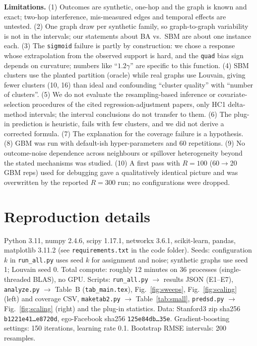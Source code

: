 \documentclass{article}
\begin{document}
\textbf{Limitations.} (1) Outcomes are synthetic, one-hop and the graph is known and exact; two-hop interference, mis-measured edges and temporal effects are untested. (2) One graph draw per synthetic family, so graph-to-graph variability is not in the intervals; our statements about BA vs.\ SBM are about one instance each. (3) The \texttt{sigmoid} failure is partly by construction: we chose a response whose extrapolation from the observed support is hard, and the \texttt{quad} bias sign depends on curvature; numbers like ``$1.2\gamma$'' are specific to this function. (4) SBM clusters use the planted partition (oracle) while real graphs use Louvain, giving fewer clusters (10, 16) than ideal and confounding ``cluster quality'' with ``number of clusters''. (5) We do not evaluate the resampling-based inference or covariate-selection procedures of the cited regression-adjustment papers, only HC1 delta-method intervals; the interval conclusions do not transfer to them. (6) The plug-in prediction is heuristic, fails with few clusters, and we did not derive a corrected formula. (7) The explanation for the coverage failure is a hypothesis. (8) GBM was run with default-ish hyper-parameters and 60 repetitions. (9) No outcome-noise dependence across neighbours or spillover heterogeneity beyond the stated mechanisms was studied. (10) A first pass with $R=100$ (60$\to$20 GBM reps) used for debugging gave a qualitatively identical picture and was overwritten by the reported $R=300$ run; no configurations were dropped.




\appendix
\section{Reproduction details}
Python 3.11, numpy 2.4.6, scipy 1.17.1, networkx 3.6.1, scikit-learn, pandas, matplotlib 3.11.2 (see \texttt{requirements.txt} in the code folder). Seeds: configuration $k$ in \texttt{run\_all.py} uses seed $k$ for assignment and noise; synthetic graphs use seed 1; Louvain seed 0. Total compute: roughly 12 minutes on 36 processes (single-threaded BLAS), no GPU. Scripts: \texttt{run\_all.py} $\to$ results JSON (E1--E7), \texttt{analyze.py} $\to$ Table~B (\texttt{tab\_main.tex}), Fig.~\ref{fig:sweeps}, Fig.~\ref{fig:scaling} (left) and coverage CSV, \texttt{maketab2.py} $\to$ Table~\ref{tab:small}, \texttt{predsd.py} $\to$ Fig.~\ref{fig:scaling} (right) and the plug-in statistics. Data: Stanford3 zip sha256 \texttt{b1221e41\ldots e8720d}, ego-Facebook sha256 \texttt{125e84db\ldots 35e}. Gradient-boosting settings: 150 iterations, learning rate 0.1. Bootstrap RMSE intervals: 200 resamples.
\end{document}
